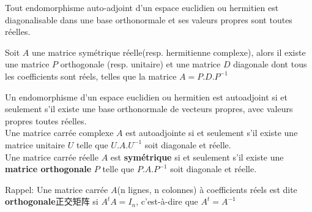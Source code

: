 \documentclass{book}
\begin{document}
\begin{theorem}
Tout endomorphisme auto-adjoint d'un espace euclidien ou hermitien est diagonalisable dans une base orthonormale et ses valeurs propres sont toutes r\'eelles.
\end{theorem}

\begin{theorem}
Soit $A$ une matrice sym\'etrique r\'eelle(resp. hermitienne complexe),
alors il existe une matrice $P$ orthogonale (resp. unitaire) et une matrice $D$ diagonale dont tous les coefficients sont r\'eels,
telles que la matrice $A = P.D.P^{-1}$
\end{theorem}

\begin{theorem}
Un endomorphisme d'un espace euclidien ou hermitien est autoadjoint
si et seulement s'il existe une base orthonormale de vecteurs propres, avec valeurs propres toutes r\'eelles.\\
Une matrice carr\'ee complexe $A$ est autoadjointe si et seulement s'il existe une matrice unitaire $U$ telle que $U.A.U^{-1}$ soit diagonale et r\'eelle.\\
Une matrice carr\'ee r\'eelle $A$ est \textbf{sym\'etrique} si et seulement s'il existe une \textbf{matrice orthogonale} $P$
telle que $P.A.P^{-1}$ soit diagonale et r\'eelle.
\end{theorem}
Rappel:
Une matrice carr\'ee $A$(n lignes, n colonnes) \`a coefficients r\'eels est dite \textbf{orthogonale}正交矩阵 si $A^t A = I_n$, c'est-\`a-dire que $A^t = A^{-1}$
\end{document}
